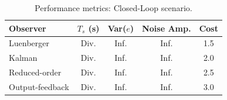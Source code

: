 \begin{table}[htbp]
\centering
\begin{tabularx}{\textwidth}{l CCCC}
\toprule
Observer & $T_s$ (s) & Var($e$) & Noise Amp. & Cost \\
\midrule
Luenberger & Div. & Inf. & Inf. & 1.5 \\
Kalman & Div. & Inf. & Inf. & 2.0 \\
Reduced-order & Div. & Inf. & Inf. & 2.5 \\
Output-feedback & Div. & Inf. & Inf. & 3.0 \\
\bottomrule
\end{tabularx}
\caption{Performance metrics: Closed-Loop scenario.}
\label{tab:metrics_cl}
\end{table}
